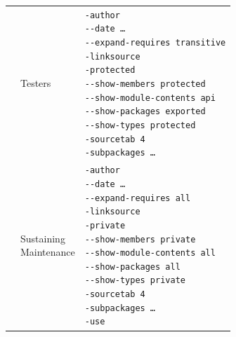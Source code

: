 \begin{longtable}{|l|l|X|}
\multirow{2}{*}{\makecell{\nameref{sec:Extension}\index{product type!extension}}} 
  & Testers
  & \makecell[l]{\texttt{-author}
  \\ \texttt{-{}-date …}
  \\ \texttt{-{}-expand-requires transitive}
  \\ \texttt{-linksource}
  \\ \texttt{-protected} 
  \\ \texttt{-{}-show-members protected}
  \\ \texttt{-{}-show-module-contents api}
  \\ \texttt{-{}-show-packages exported}
  \\ \texttt{-{}-show-types protected}
  \\ \texttt{-sourcetab 4}
  \\ \texttt{-subpackages …}
  } \\
\cline{2-3}
  & \makecell[l]{Sustaining \\
  Maintenance}
  & \makecell[l]{\texttt{-author}
  \\ \texttt{-{}-date …}
  \\ \texttt{-{}-expand-requires all}
  \\ \texttt{-linksource}
  \\ \texttt{-private} 
  \\ \texttt{-{}-show-members private}
  \\ \texttt{-{}-show-module-contents all}
  \\ \texttt{-{}-show-packages all}
  \\ \texttt{-{}-show-types private}
  \\ \texttt{-sourcetab 4}
  \\ \texttt{-subpackages …}
  \\ \texttt{-use}
  } \\
\hline


\end{longtable}

